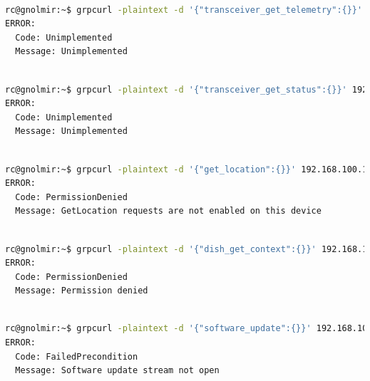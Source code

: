 \documentclass[IN,11pt,twoside,openright,bachelor,english]{tumthesis}
\begin{document}
\begin{lstlisting}[language=bash,basicstyle=\tiny]

rc@gnolmir:~$ grpcurl -plaintext -d '{"transceiver_get_telemetry":{}}' 192.168.100.1:9200 SpaceX.API.Device.Device/Handle
ERROR:
  Code: Unimplemented
  Message: Unimplemented
\end{lstlisting}
\begin{lstlisting}[language=bash,basicstyle=\tiny]

rc@gnolmir:~$ grpcurl -plaintext -d '{"transceiver_get_status":{}}' 192.168.100.1:9200 SpaceX.API.Device.Device/Handle
ERROR:
  Code: Unimplemented
  Message: Unimplemented
\end{lstlisting}
\begin{lstlisting}[language=bash,basicstyle=\tiny]

rc@gnolmir:~$ grpcurl -plaintext -d '{"get_location":{}}' 192.168.100.1:9200 SpaceX.API.Device.Device/Handle
ERROR:
  Code: PermissionDenied
  Message: GetLocation requests are not enabled on this device
\end{lstlisting}
\begin{lstlisting}[language=bash,basicstyle=\tiny]

rc@gnolmir:~$ grpcurl -plaintext -d '{"dish_get_context":{}}' 192.168.100.1:9200 SpaceX.API.Device.Device/Handle
ERROR:
  Code: PermissionDenied
  Message: Permission denied
\end{lstlisting}
\begin{lstlisting}[language=bash,basicstyle=\tiny]

rc@gnolmir:~$ grpcurl -plaintext -d '{"software_update":{}}' 192.168.100.1:9200 SpaceX.API.Device.Device/Handle
ERROR:
  Code: FailedPrecondition
  Message: Software update stream not open
\end{lstlisting}
\end{document}
